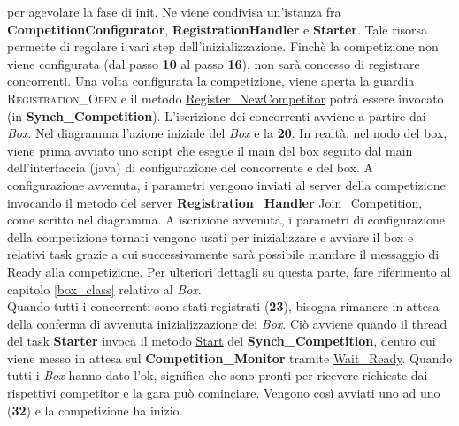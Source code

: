 per agevolare la fase di init. Ne viene condivisa un'istanza fra \textbf{CompetitionConfigurator}, \textbf{RegistrationHandler} e \textbf{Starter}.
Tale risorsa permette di regolare i vari step dell'inizializzazione. Finch\`{e} la competizione non viene configurata (dal passo \textbf{10} al passo \textbf{16}),
non sar\`{a} concesso di registrare concorrenti. Una volta configurata la competizione, viene aperta la guardia \textsc{Registration\_Open} e il metodo
\underline{Register\_NewCompetitor} potr\`{a} essere invocato (in \textbf{Synch\_Competition}). L'iscrizione dei concorrenti avviene a partire dai \emph{Box}.
Nel diagramma l'azione iniziale del \emph{Box} e la \textbf{20}. In realt\`{a}, nel nodo del box, viene prima avviato uno script che esegue il main del box
seguito dal main dell'interfaccia (java) di configurazione del concorrente e del box. A configurazione avvenuta, i parametri vengono inviati al server della
competizione invocando il metodo del server \textbf{Registration\_Handler} \underline{Join\_Competition}, come scritto nel diagramma. A iscrizione avvenuta, 
i parametri di configurazione della competizione tornati vengono usati per inizializzare e avviare il box e relativi task grazie a cui successivamente
sar\`{a} possibile mandare il messaggio di \underline{Ready} alla competizione. Per ulteriori dettagli su questa parte, fare riferimento al capitolo
\ref{box_class} relativo al \emph{Box}.\\
Quando tutti i concorrenti sono stati registrati (\textbf{23}), bisogna rimanere in attesa della conferma di avvenuta inizializzazione dei \emph{Box}. Ci\`{o}
avviene quando il thread del task \textbf{Starter} invoca il metodo \underline{Start} del \textbf{Synch\_Competition}, dentro cui viene messo in attesa
sul \textbf{Competition\_Monitor} tramite \underline{Wait\_Ready}. Quando tutti i \emph{Box} hanno dato l'ok, significa che sono pronti per ricevere
richieste dai rispettivi competitor e la gara pu\`{o} cominciare. Vengono cos\`{i} avviati uno ad uno (\textbf{32}) e la competizione ha inizio.
